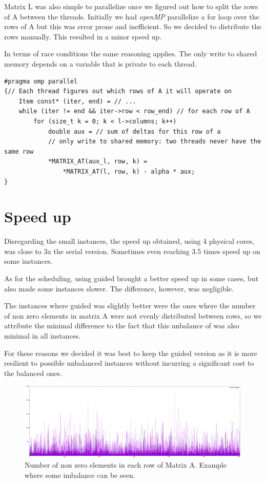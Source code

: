 \documentclass[a4paper]{article}
\begin{document}
Matrix L was also simple to parallelize once we figured out how to split the
rows of A between the threads. Initially we had \textit{openMP} parallelize a for loop
over the rows of A but this was error prone and inefficient. So we decided to
distribute the rows manually. This resulted in a minor speed up.

In terms of race conditions the same reasoning applies. The only write to shared
memory depends on a variable that is private to each thread.

\begin{verbatim}
#pragma omp parallel
{// Each thread figures out which rows of A it will operate on
    Item const* (iter, end) = // ...
    while (iter != end && iter->row < row_end) // for each row of A
        for (size_t k = 0; k < l->columns; k++)
            double aux = // sum of deltas for this row of a
            // only write to shared memory: two threads never have the same row
            *MATRIX_AT(aux_l, row, k) =
                *MATRIX_AT(l, row, k) - alpha * aux;
}
\end{verbatim}

\section{Speed up}
Disregarding the small instances, the speed up obtained, using 4 physical cores,
was close to 3x the serial version. Sometimes even reaching 3.5 times speed up
on some instances.

As for the scheduling, using guided brought a better speed up in some cases, but
also made some instances slower. The difference, however, was negligible.

The instances where guided was slightly better were the ones where the number of
non zero elements in matrix A were not evenly distributed between rows, so we
attribute the minimal difference to the fact that this unbalance of was also
minimal in all instances.

For these reasons we decided it was best to keep the guided version as it is more
resilient to possible unbalanced instances without incurring a significant cost
to the balanced ones.

\begin{figure}[H]
    \centering
        \includegraphics[width=\textwidth]{./ML1M.png}
        \caption{Number of non zero elements in each row of Matrix A.
        Example where some imbalance can be seen.}
\end{figure}
\end{document}

